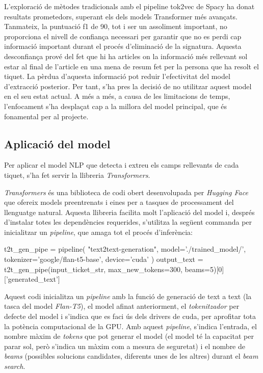 L'exploració de mètodes tradicionals amb el pipeline tok2vec de Spacy ha donat resultats prometedors, superant els dels models Transformer més avançats. Tanmateix, la puntuació f1 de 90, tot i ser un assoliment important, no proporciona el nivell de confiança necessari per garantir que no es perdi cap informació important durant el procés d'eliminació de la signatura. Aquesta desconfiança prové del fet que hi ha articles on la informació més rellevant sol estar al final de l'article en una mena de resum fet per la persona que ha resolt el tiquet. La pèrdua d'aquesta informació pot reduir l'efectivitat del model d'extracció posterior. Per tant, s'ha pres la decisió de no utilitzar aquest model en el seu estat actual. A més a més, a causa de les limitacions de temps, l'enfocament s'ha desplaçat cap a la millora del model principal, que és fonamental per al projecte.

\subsection{Aplicació del model}
Per aplicar el model NLP que detecta i extreu els camps rellevants de cada tiquet, s'ha fet servir la llibreria \textit{Transformers}.

\textit{Transformers} és una biblioteca de codi obert desenvolupada per \textit{Hugging Face} \cite{Hugging-Face} que ofereix models preentrenats i eines per a tasques de processament del llenguatge natural. Aquesta llibreria facilita molt l'aplicació del model i, després d'instalar totes les dependències requerides, s'utilitza la següent commanda per inicialitzar un \textit{pipeline}, que amaga tot el procés d'inferència:

\begin{python}
t2t_gen_pipe = pipeline(
     "text2text-generation",
     model='./trained_model/',
     tokenizer='google/flan-t5-base',
     device='cuda'
     )     
output_text = t2t_gen_pipe(input_ticket_str, max_new_tokens=300, beams=5)[0]['generated_text']
\end{python}

Aquest codi inicialitza un \textit{pipeline} amb la funció de generació de text a text (la tasca del model \textit{Flan-T5}), el model afinat anteriorment, el \textit{tokenitzador} per defecte del model i s'indica que es faci ús dels drivers de cuda, per aprofitar tota la potència computacional de la GPU. Amb aquest \textit{pipeline}, s'indica l'entrada, el nombre màxim de \textit{tokens} que pot generar el model (el model té la capacitat per parar sol, però s'indica un màxim com a mesura de seguretat) i el nombre de \textit{beams} (possibles solucions candidates, diferents unes de les altres) durant el \textit{beam search}.


